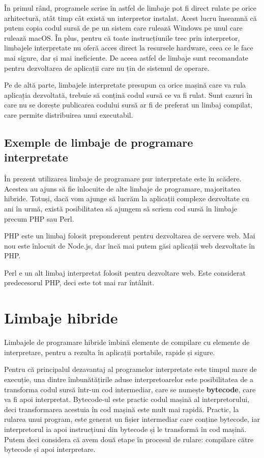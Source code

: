 În primul rând, programele scrise în astfel de limbaje pot fi direct rulate pe
orice arhitectură, atât timp cât există un interpretor instalat. Acest lucru înseamnă
că putem copia codul sursă de pe un sistem care rulează Windows pe unul care
rulează macOS. În plus, pentru că toate instrucțiunile trec prin interpretor,
limbajele interpretate nu oferă acces direct la resursele hardware, ceea ce le
face mai sigure, dar și mai ineficiente. De aceea astfel de limbaje sunt
recomandate pentru dezvoltarea de aplicații care nu țin de sistemul de operare.

Pe de altă parte, limbajele interpretate presupun ca orice mașină care va rula
aplicația dezvoltată, trebuie să conțină codul sursă ce va fi rulat. Sunt cazuri
în care nu se dorește publicarea codului sursă ar fi de preferat un limbaj
compilat, care permite distribuirea unui executabil.

\subsection{Exemple de limbaje de programare interpretate}
\label{sec:appdev:interpreted-lang:ex}

În prezent utilizarea limbaje de programare pur interpretate este în scădere.
Acestea au ajuns să fie înlocuite de alte limbaje de programare, majoritatea
hibride. Totuși, dacă vom ajunge să lucrăm la aplicații complexe dezvoltate cu
ani în urmă, există posibilitatea să ajungem să scriem cod sursă în limbaje
precum PHP sau Perl.

PHP este un limbaj folosit preponderent pentru dezvoltarea de servere web. Mai
nou este înlocuit de Node.js, dar încă mai putem găsi aplicații web dezvoltate
în PHP.

Perl e un alt limbaj interpretat folosit pentru dezvoltare web. Este considerat
predecesorul PHP, deci este tot mai rar întâlnit.

\section{Limbaje hibride}
\label{sec:appdev:hybrid-lang}

Limbajele de programare hibride îmbină elemente de compilare cu elemente de
interpretare, pentru a rezulta în aplicații portabile, rapide și sigure.

Pentru că principalul dezavantaj al programelor interpretate este timpul mare de
execuție, una dintre îmbunătățirile aduse interpretoarelor este posibilitatea de a
transforma codul sursă într-un cod intermediar, care se numește \textbf{bytecode}, care
va fi apoi interpretat. Bytecode-ul este practic codul mașină al
interpretorului, deci transformarea acestuia în cod mașină este mult mai rapidă.
Practic, la rularea unui program, este generat un fișier intermediar care
conține bytecode, iar interpretorul ia apoi instrucțiuni din bytecode și le
transformă în cod mașină. Putem deci considera că avem două etape în procesul de
rulare: compilare către bytecode și apoi interpretare.

